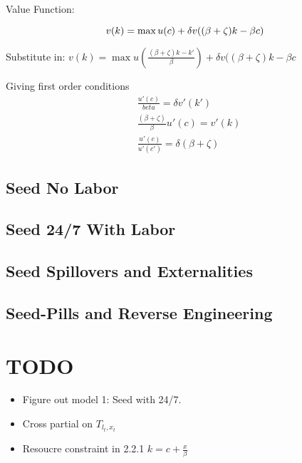 \documentclass[11pt]{article}
\begin{document}
  Value Function:

  \begin{equation}
    v(k) = \max u(c) + \delta v((\beta + \zeta)k - \beta c)\\
  \end{equation}
  
  Substitute in:
    $v(k) = \max u(\frac{(\beta + \zeta)k - k'}{\beta}) + \delta v((\beta + \zeta)k - \beta c$
    
  Giving first order conditions
  \begin{align}
    &\frac{u'(c)}{beta} = \delta v'(k')\\
    &\frac{(\beta + \zeta)}{\beta} u'(c) = v'(k)\\
    &\frac{u'(c)}{u'(c')} = \delta(\beta + \zeta)
  \end{align}

\subsection{Seed No Labor}
\label{sub:seed_no_labor}

\subsection{Seed 24/7 With Labor}
\label{sub:seed_24_7_with_labor}

\subsection{Seed Spillovers and Externalities}
\label{sub:seed_spillovers_and_externalities}

\subsection{Seed-Pills and Reverse Engineering}
\label{sub:seed_pills_and_reverse_engineering}

\section{TODO}
\label{sec:todo}

  \begin{itemize}
    \item Figure out model 1: Seed with 24/7.
    \item Cross partial on $T_{l_t,x_t}$
    \item Resoucre constraint in 2.2.1 $k = c + \frac{x}{\beta}$
  \end{itemize}
  
\end{document}
